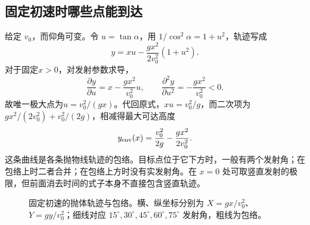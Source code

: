 \documentclass[11pt,openany,fontset=fandol]{ctexbook}
\theoremstyle{plain}\newtheorem{theorem}{定理}[chapter]\newtheorem{proposition}[theorem]{命题}
\theoremstyle{definition}\newtheorem{definition}{定义}[chapter]\newtheorem{example}{例}[chapter]
\theoremstyle{remark}\newtheorem*{remark}{说明}
\begin{document}
\subsection{固定初速时哪些点能到达}
给定 $v_0$，而仰角可变。令 $u=\tan\alpha$，用 $1/\cos^2\alpha=1+u^2$，轨迹写成
\begin{equation}
y=xu-\frac{gx^2}{2v_0^2}(1+u^2).
\end{equation}
对于固定$x>0$，对发射参数求导，
\[\frac{\partial y}{\partial u}=x-\frac{gx^2}{v_0^2}u,\qquad
\frac{\partial^2y}{\partial u^2}=-\frac{gx^2}{v_0^2}<0.\]
故唯一极大点为$u=v_0^2/(gx)$。代回原式，$xu=v_0^2/g$，而二次项为$gx^2/(2v_0^2)+v_0^2/(2g)$，相减得最大可达高度
\begin{equation}
y_{\rm env}(x)=\frac{v_0^2}{2g}-\frac{gx^2}{2v_0^2}.
\end{equation}
这条曲线是各条抛物线轨迹的包络。目标点位于它下方时，一般有两个发射角；在包络上时二者合并；在包络上方时没有实发射角。在 $x=0$ 处可取竖直发射的极限，但前面消去时间的式子本身不直接包含竖直轨迹。
\begin{figure}[htbp]
\centering
{}
\caption{固定初速的抛体轨迹与包络。横、纵坐标分别为 $X=gx/v_0^2$、$Y=gy/v_0^2$；细线对应 $15^\circ,30^\circ,45^\circ,60^\circ,75^\circ$ 发射角，粗线为包络。}\label{fig:projectile-envelope}
\end{figure}
\end{document}

